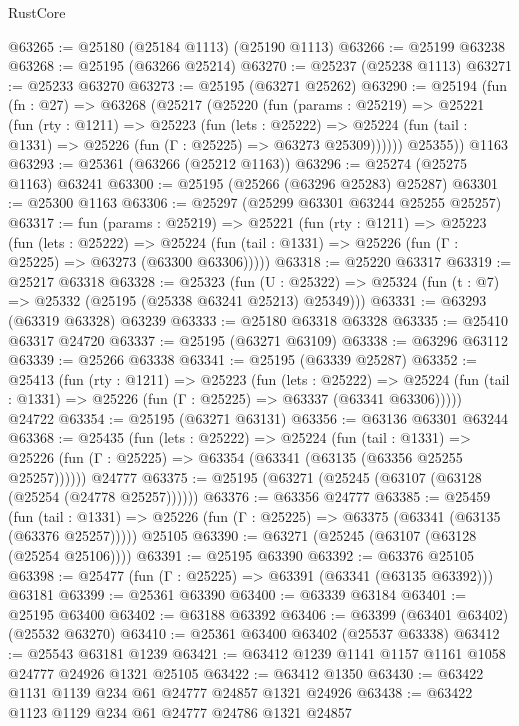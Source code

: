 \begin{lexlean}{RustCore}
\begin{coremodule}
@63265 := @25180 (@25184 @1113) (@25190 @1113)
@63266 := @25199 @63238
@63268 := @25195 (@63266 @25214)
@63270 := @25237 (@25238 @1113)
@63271 := @25233 @63270
@63273 := @25195 (@63271 @25262)
@63290 := @25194
    (fun (fn : @27) =>
    @63268
      (@25217
        (@25220
          (fun (params : @25219) =>
          @25221
            (fun (rty : @1211) =>
            @25223
              (fun (lets : @25222) =>
              @25224 (fun (tail : @1331) => @25226 (fun (Γ : @25225) => @63273 @25309))))))
        @25355))
    @1163
@63293 := @25361 (@63266 (@25212 @1163))
@63296 := @25274 (@25275 @1163) @63241
@63300 := @25195 (@25266 (@63296 @25283) @25287)
@63301 := @25300 @1163
@63306 := @25297 (@25299 @63301 @63244 @25255 @25257)
@63317 := fun (params : @25219) =>
  @25221
    (fun (rty : @1211) =>
    @25223
      (fun (lets : @25222) =>
      @25224 (fun (tail : @1331) => @25226 (fun (Γ : @25225) => @63273 (@63300 @63306)))))
@63318 := @25220 @63317
@63319 := @25217 @63318
@63328 := @25323
    (fun (U : @25322) => @25324 (fun (t : @7) => @25332 (@25195 (@25338 @63241 @25213) @25349)))
@63331 := @63293 (@63319 @63328) @63239
@63333 := @25180 @63318 @63328
@63335 := @25410 @63317 @24720
@63337 := @25195 (@63271 @63109)
@63338 := @63296 @63112
@63339 := @25266 @63338
@63341 := @25195 (@63339 @25287)
@63352 := @25413
    (fun (rty : @1211) =>
    @25223
      (fun (lets : @25222) =>
      @25224 (fun (tail : @1331) => @25226 (fun (Γ : @25225) => @63337 (@63341 @63306)))))
    @24722
@63354 := @25195 (@63271 @63131)
@63356 := @63136 @63301 @63244
@63368 := @25435
    (fun (lets : @25222) =>
    @25224
      (fun (tail : @1331) =>
      @25226 (fun (Γ : @25225) => @63354 (@63341 (@63135 (@63356 @25255 @25257))))))
    @24777
@63375 := @25195 (@63271 (@25245 (@63107 (@63128 (@25254 (@24778 @25257))))))
@63376 := @63356 @24777
@63385 := @25459
    (fun (tail : @1331) => @25226 (fun (Γ : @25225) => @63375 (@63341 (@63135 (@63376 @25257)))))
    @25105
@63390 := @63271 (@25245 (@63107 (@63128 (@25254 @25106))))
@63391 := @25195 @63390
@63392 := @63376 @25105
@63398 := @25477 (fun (Γ : @25225) => @63391 (@63341 (@63135 @63392))) @63181
@63399 := @25361 @63390
@63400 := @63339 @63184
@63401 := @25195 @63400
@63402 := @63188 @63392
@63406 := @63399 (@63401 @63402) (@25532 @63270)
@63410 := @25361 @63400 @63402 (@25537 @63338)
@63412 := @25543 @63181 @1239
@63421 := @63412 @1239 @1141 @1157 @1161 @1058 @24777 @24926 @1321 @25105
@63422 := @63412 @1350
@63430 := @63422 @1131 @1139 @234 @61 @24777 @24857 @1321 @24926
@63438 := @63422 @1123 @1129 @234 @61 @24777 @24786 @1321 @24857

\end{coremodule}
\end{lexlean}
